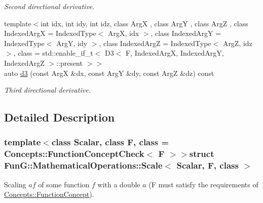 \begin{DoxyCompactItemize}
\begin{DoxyCompactList}\small\item\em Second directional derivative. \end{DoxyCompactList}\item 
{\footnotesize template$<$int idx, int idy, int idz, class Arg\-X , class Arg\-Y , class Arg\-Z , class Indexed\-Arg\-X  = Indexed\-Type$<$ Arg\-X, idx $>$, class Indexed\-Arg\-Y  = Indexed\-Type$<$ Arg\-Y, idy $>$, class Indexed\-Arg\-Z  = Indexed\-Type$<$ Arg\-Z, idz $>$, class  = std\-::enable\-\_\-if\-\_\-t$<$                           D3$<$ F, Indexed\-Arg\-X, Indexed\-Arg\-Y, Indexed\-Arg\-Z $>$\-::present $>$$>$ }\\auto \hyperlink{structFunG_1_1MathematicalOperations_1_1Scale_a6ce8474b165f7d6787ced74f89353f8e}{d3} (const Arg\-X \&dx, const Arg\-Y \&dy, const Arg\-Z \&dz) const 
\begin{DoxyCompactList}\small\item\em Third directional derivative. \end{DoxyCompactList}\end{DoxyCompactItemize}


\subsection{Detailed Description}
\subsubsection*{template$<$class Scalar, class F, class = Concepts\-::\-Function\-Concept\-Check$<$ F $>$$>$struct Fun\-G\-::\-Mathematical\-Operations\-::\-Scale$<$ Scalar, F, class $>$}

Scaling $ af $ of some function $ f $ with a double $ a $ (F must satisfy the requirements of \hyperlink{structFunG_1_1Concepts_1_1FunctionConcept}{Concepts\-::\-Function\-Concept}). 

